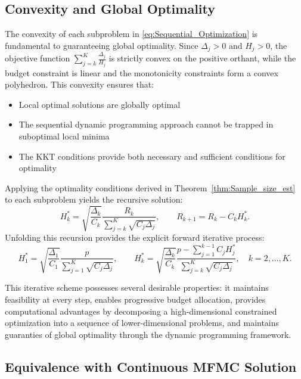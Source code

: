 \subsection{Convexity and Global Optimality}

The convexity of each subproblem in \eqref{eq:Sequential_Optimization} is fundamental to guaranteeing global optimality. Since $\Delta_j > 0$ and $H_j > 0$, the objective function $\sum_{j=k}^K \frac{\Delta_j}{H_j}$ is strictly convex on the positive orthant, while the budget constraint is linear and the monotonicity constraints form a convex polyhedron. This convexity ensures that:
\begin{itemize}
    \item Local optimal solutions are globally optimal
    \item The sequential dynamic programming approach cannot be trapped in suboptimal local minima
    \item The KKT conditions provide both necessary and sufficient conditions for optimality
\end{itemize}


Applying the optimality conditions derived in Theorem~\ref{thm:Sample_size_est} to each subproblem yields the recursive solution:
\begin{equation*}
    H_k^* = \sqrt{\frac{\Delta_k}{C_k}} \frac{R_k}{\sum_{j=k}^K\sqrt{C_j\Delta_j}},
    \qquad 
    R_{k+1} = R_k - C_k H_k^*.
\end{equation*}
Unfolding this recursion provides the explicit forward iterative process:
\begin{equation}\label{eq:MFMC_New_RealValued_Sample_Size}
    H_1^* = \sqrt{\frac{\Delta_1}{C_1}} \frac{p}{\sum_{j=1}^K\sqrt{C_j\Delta_j}}, 
    \qquad 
    H_k^* = \sqrt{\frac{\Delta_k}{C_k}} \frac{p-\sum_{j=1}^{k-1}C_jH_j^*}{\sum_{j=k}^K\sqrt{C_j\Delta_j}}, 
    \quad k = 2,\ldots, K.
\end{equation}


This iterative scheme possesses several desirable properties: it maintains feasibility at every step, enables progressive budget allocation, provides computational advantages by decomposing a high-dimensional constrained optimization into a sequence of lower-dimensional problems, and maintains guaranties of global optimality through the dynamic programming framework.


\subsection{Equivalence with Continuous MFMC Solution}

